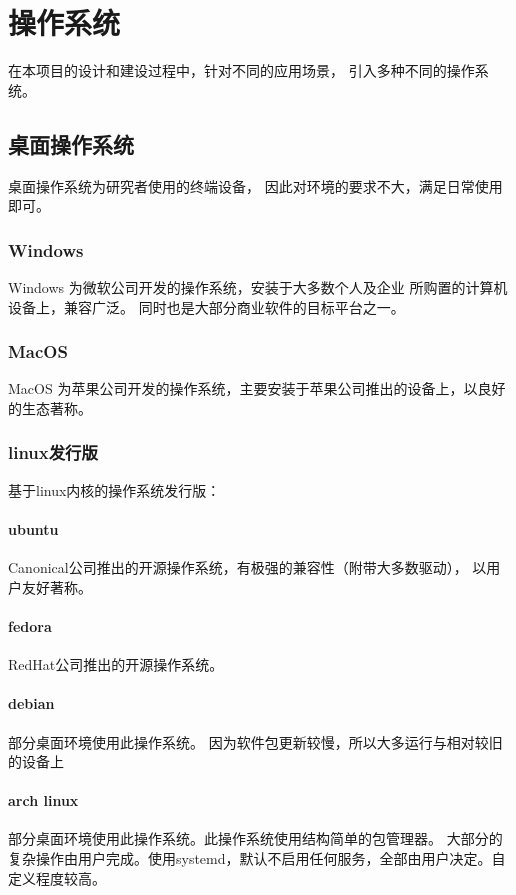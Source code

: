 \newpage
\section{操作系统}
在本项目的设计和建设过程中，针对不同的应用场景，
引入多种不同的操作系统。

\subsection{桌面操作系统}
桌面操作系统为研究者使用的终端设备，
因此对环境的要求不大，满足日常使用即可。

\subsubsection{Windows\cite{windows11}}
Windows 为微软公司开发的操作系统，安装于大多数个人及企业
所购置的计算机设备上，兼容广泛。
同时也是大部分商业软件的目标平台之一。

\subsubsection{MacOS\cite{macOSSequoia}}
MacOS 为苹果公司开发的操作系统，主要安装于苹果公司推出的设备上，以良好的生态著称。

\subsubsection{linux发行版}
基于linux内核的操作系统发行版：

\paragraph{ubuntu\cite{ubuntuChina}}
Canonical公司推出的开源操作系统，有极强的兼容性（附带大多数驱动），
以用户友好著称。

\paragraph{fedora\cite{fedoraProject}}
RedHat公司推出的开源操作系统。

\paragraph{debian\cite{debian}}
部分桌面环境使用此操作系统。
因为软件包更新较慢，所以大多运行与相对较旧的设备上

\paragraph{arch linux\cite{archLinux}}
部分桌面环境使用此操作系统。此操作系统使用结构简单的包管理器。
大部分的复杂操作由用户完成。使用systemd，默认不启用任何服务，全部由用户决定。自定义程度较高。

